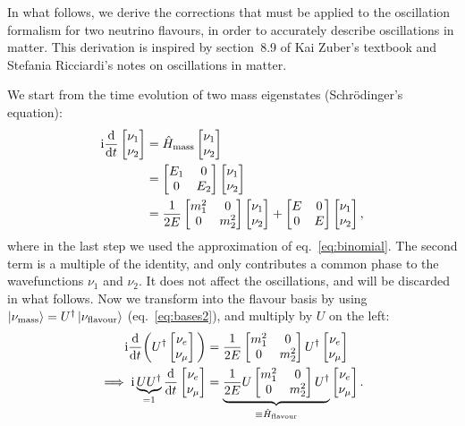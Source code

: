 In what follows, we derive the corrections that must be applied to the
oscillation formalism for two neutrino flavours, in order to accurately
describe oscillations in matter.
This derivation is inspired by section~8.9 of Kai Zuber's textbook\cite{zuber}
and Stefania Ricciardi's notes on oscillations in matter\cite{ricciardi}.

We start from the time evolution of two mass eigenstates (Schrödinger's
equation):
\begin{align}
	\mathrm{i} \frac{\mathrm{d}}{\mathrm{d} t} \begin{bmatrix} \nu_1 \\ \nu_2 \end{bmatrix}
		&= \hat{H}_\text{mass} \begin{bmatrix} \nu_1 \\ \nu_2
		\end{bmatrix}\nonumber \\
		&= \begin{bmatrix} E_1 & 0 \\ 0 & E_2 \end{bmatrix} \begin{bmatrix} \nu_1
\\ \nu_2 \end{bmatrix}\nonumber \\
&= \frac{1}{2E} \begin{bmatrix}m^2_1 & 0 \\ 0 & m^2_2\end{bmatrix} \begin{bmatrix}\nu_1 \\ \nu_2\end{bmatrix} + \begin{bmatrix}E &
0 \\ 0 & E\end{bmatrix} \begin{bmatrix}\nu_1 \\ \nu_2\end{bmatrix},\label{eq:massvacuum}
\end{align}
where in the last step we used the approximation of eq.~\ref{eq:binomial}.
The second term is a multiple of the identity, and only contributes a common phase to
the wavefunctions $\nu_1$ and $\nu_2$. It does not affect the oscillations, and
will be discarded in what follows.
Now we transform into the flavour basis by using $\ket{\nu_\text{mass}} =
U^\dagger \ket{\nu_\text{flavour}}$ (eq.~\ref{eq:bases2}), and multiply by $U$ on the left:
\begin{align*}
	\mathrm{i} \frac{\mathrm{d}}{\mathrm{d} t}\bigg( U^\dagger \begin{bmatrix} \nu_e \\ \nu_\mu
	\end{bmatrix}\bigg)
		&= \frac{1}{2E}\begin{bmatrix}m^2_1 & 0 \\ 0 & m^2_2\end{bmatrix} U^\dagger \begin{bmatrix}\nu_e
			\\ \nu_\mu\end{bmatrix} \\
		\implies 
	\mathrm{i} \underbrace{U U^\dagger}_{=1} \frac{\mathrm{d}}{\mathrm{d} t}\begin{bmatrix}\nu_e \\ \nu_\mu\end{bmatrix}
		&= \underbrace{\frac{1}{2E} U \begin{bmatrix}m^2_1 & 0 \\ 0 & m^2_2\end{bmatrix}
			U^\dagger }_{\equiv \hat{H}_{\text{flavour}}} \begin{bmatrix}\nu_e
			\\ \nu_\mu\end{bmatrix}.
\end{align*}
